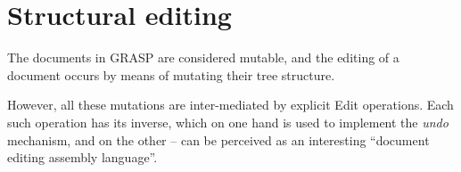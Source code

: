 \documentclass[sigconf]{acmart}
\newenvironment{Snippet}{\Verbatim[samepage=true]}{\endVerbatim}
\begin{document}







\section{Structural editing}

The documents in GRASP are considered mutable,
and the editing of a document occurs by means
of mutating their tree structure.

However, all these mutations are inter-mediated
by explicit Edit operations. Each such operation
has its inverse, which on one hand is used to
implement the \textit{undo} mechanism, and on 
the other -- can be perceived as an interesting 
``document editing assembly language''.
\end{document}
